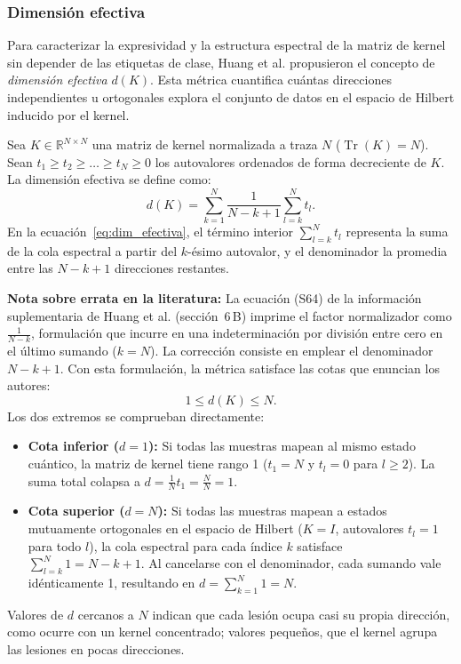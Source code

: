 
\subsubsection{Dimensión efectiva}
\label{sec:dimension_efectiva}

Para caracterizar la expresividad y la estructura espectral de la matriz de kernel sin
depender de las etiquetas de clase, Huang et al. \cite{huang2021power} propusieron el concepto
de \textit{dimensión efectiva} $d(K)$. Esta métrica cuantifica cuántas direcciones
independientes u ortogonales explora el conjunto de datos en el espacio de Hilbert inducido
por el kernel.

Sea $K \in \mathbb{R}^{N \times N}$ una matriz de kernel normalizada a traza $N$
($\operatorname{Tr}(K) = N$). Sean $t_1 \ge t_2 \ge \dots \ge t_N \ge 0$ los autovalores
ordenados de forma decreciente de $K$. La dimensión efectiva se define como:
\begin{equation}
  d(K) = \sum_{k=1}^{N} \frac{1}{N - k + 1}\sum_{l=k}^{N} t_l.
  \label{eq:dim_efectiva}
\end{equation}
En la ecuación~\eqref{eq:dim_efectiva}, el término interior $\sum_{l=k}^{N} t_l$ representa
la suma de la cola espectral a partir del $k$-ésimo autovalor, y el denominador
la promedia entre las $N-k+1$ direcciones restantes.

\textbf{Nota sobre errata en la literatura:} La ecuación (S64) de la información suplementaria de Huang et al. \cite{huang2021power} (sección~6\,B) imprime el factor normalizador como $\frac{1}{N - k}$, formulación que incurre en una indeterminación por división entre cero en el último sumando ($k = N$). La corrección consiste en emplear el denominador $N - k + 1$. Con esta formulación, la métrica satisface las cotas que enuncian los autores:
\begin{equation}
  1 \le d(K) \le N.
  \label{eq:effective_dim_bounds}
\end{equation}
Los dos extremos se comprueban directamente:
\begin{itemize}
  \item \textbf{Cota inferior ($d = 1$):} Si todas las muestras mapean al mismo estado cuántico, la matriz de kernel tiene rango 1 ($t_1 = N$ y $t_l = 0$ para $l \ge 2$). La suma total colapsa a $d = \frac{1}{N} t_1 = \frac{N}{N} = 1$.
  \item \textbf{Cota superior ($d = N$):} Si todas las muestras mapean a estados mutuamente ortogonales en el espacio de Hilbert ($K = I$, autovalores $t_l = 1$ para todo $l$), la cola espectral para cada índice $k$ satisface $\sum_{l=k}^N 1 = N - k + 1$. Al cancelarse con el denominador, cada sumando vale idénticamente 1, resultando en $d = \sum_{k=1}^N 1 = N$.
\end{itemize}

Valores de $d$ cercanos a $N$ indican que cada lesión ocupa casi su propia dirección, como ocurre con un kernel concentrado; valores pequeños, que el kernel agrupa las lesiones en pocas direcciones.
